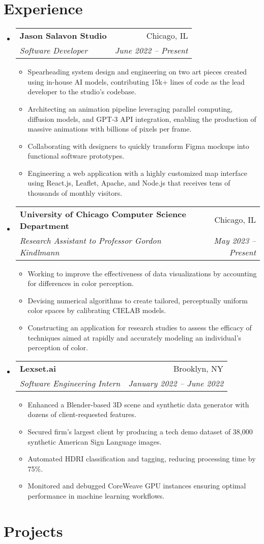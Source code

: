 \documentclass[letterpaper,11pt]{article}
\makeatletter
\newcommand{\resumeItem}[1]{
  \item\small{
    {#1 \vspace{-2pt}}
  }
}
\newcommand{\resumeSubheading}[4]{
  \vspace{-2pt}\item
    \begin{tabular*}{0.97\textwidth}[t]{l@{\extracolsep{\fill}}r}
      \textbf{#1} & #2 \\
      \textit{\small#3} & \textit{\small #4} \\
    \end{tabular*}\vspace{-7pt}
}
\newcommand{\resumeSubHeadingListStart}{\begin{itemize}[leftmargin=0.125in, label={}]}
\newcommand{\resumeSubHeadingListEnd}{\end{itemize}}
\newcommand{\resumeItemListStart}{\begin{itemize}[leftmargin=0.185in]
}
\newcommand{\resumeItemListEnd}{\end{itemize}\vspace{-5pt}}
\makeatother
\begin{document}
\section{Experience}
  \resumeSubHeadingListStart
    \resumeSubheading
      {Jason Salavon Studio}
      {Chicago, IL}
      {Software Developer}
      {June 2022 -- Present}
      \resumeItemListStart
        \resumeItem{Spearheading system design and engineering on two art pieces created using in-house AI models, contributing 15k+ lines of code as the lead developer to the studio's codebase.}
        \resumeItem{Architecting an animation pipeline leveraging parallel computing, diffusion models, and GPT-3 API integration, enabling the production of massive animations with billions of pixels per frame.}
        \resumeItem{Collaborating with designers to quickly transform Figma mockups into functional software prototypes.}
        \resumeItem{Engineering a web application with a highly customized map interface using React.js, Leaflet, Apache, and Node.js that receives tens of thousands of  monthly visitors.}
      \resumeItemListEnd
    \resumeSubheading
      {University of Chicago Computer Science Department}
      {Chicago, IL}
      {Research Assistant to Professor Gordon Kindlmann}
      {May 2023 -- Present}
      \resumeItemListStart
        \resumeItem{Working to improve the effectiveness of data visualizations by accounting for differences in color perception.}
        \resumeItem{Devising numerical algorithms to create tailored, perceptually uniform color spaces by calibrating CIELAB models.}\resumeItem{Constructing an application for research studies to assess the efficacy of techniques aimed at rapidly and accurately modeling an individual's  perception of color.}
      \resumeItemListEnd
    \resumeSubheading
      {Lexset.ai}
      {Brooklyn, NY}
      {Software Engineering Intern}
      {January 2022 -- June 2022}
      \resumeItemListStart
        \resumeItem{Enhanced a Blender-based 3D scene and synthetic data generator with dozens of client-requested features.}
        \resumeItem{Secured firm's largest client by producing a tech demo dataset of 38,000 synthetic American Sign Language images.}\resumeItem{Automated HDRI classification and tagging, reducing processing time by 75\%.}
        \resumeItem{Monitored and debugged CoreWeave GPU instances ensuring optimal performance in machine learning workflows. }
      \resumeItemListEnd
  \resumeSubHeadingListEnd

\section{Projects}
\end{document}
